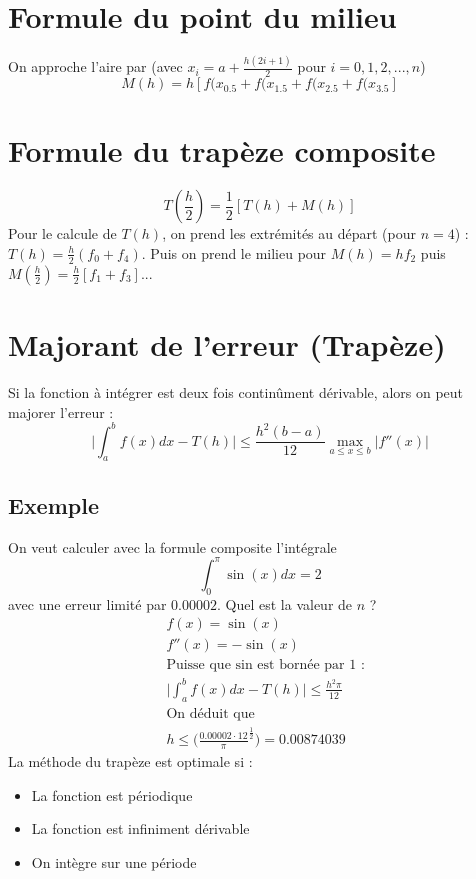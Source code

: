 \documentclass[a4paper,9pt]{extarticle}
\begin{document}
\begin{multicols*}{2}
\section{Formule du point du milieu}

On approche l'aire par (avec $x_i=a+\frac{h(2i+1)}{2}$ pour $i=0,1,2,...,n$)
$$
M(h)=h[f(x_{0.5}+f(x_{1.5}+f(x_{2.5}+f(x_{3.5}]
$$

\section{Formule du trapèze composite}

$$
T(\frac{h}{2})=\frac{1}{2}[T(h)+M(h)]
$$
Pour le calcule de $T(h)$, on prend les extrémités au départ (pour $n=4$) : $T(h)=\frac{h}{2}(f_0+f_4)$. Puis on prend le milieu pour $M(h)=hf_2$ puis $M(\frac{h}{2})=\frac{h}{2}[f_1+f_3]$...

\section{Majorant de l'erreur (Trapèze)}
Si la fonction à intégrer est deux fois continûment dérivable, alors on peut majorer l'erreur :
$$
\Big|\int_a^bf(x)dx-T(h)\Big|\leq \frac{h^2(b-a)}{12} \max_{a\leq x \leq b}|f''(x)|
$$

\subsection*{Exemple}
On veut calculer avec la formule composite l'intégrale 
$$\int_0^\pi\sin(x)dx=2$$
avec une erreur limité par $0.00002$. Quel est la valeur de $n$ ?
\begin{align*}
& f(x)=\sin(x)\\
& f''(x)=-\sin(x)\\
& \text{Puisse que sin est bornée par 1 :}\\
& \Big|\int_a^bf(x)dx-T(h)\Big| \leq \frac{h^2\pi}{12}\\
& \text{On déduit que} \\
& h \leq \Big(\frac{0.00002\cdot12}{\pi}^{\frac{1}{2}}\Big)=0.00874039
\end{align*}
La méthode du trapèze est optimale si :
\begin{itemize}
    \item La fonction est périodique
    \item La fonction est infiniment dérivable
    \item On intègre sur une période
\end{itemize}


\end{multicols*}
\end{document}
